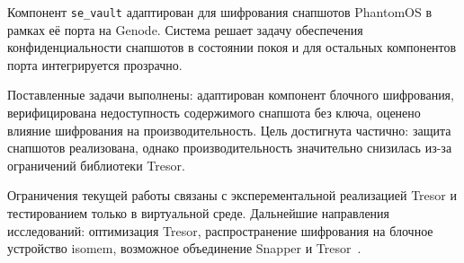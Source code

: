 \documentclass[oneside,final,14pt,a4paper]{extreport}
\theoremstyle{definition}
\theoremstyle{remark}
\theoremstyle{remark}
\begin{document}
Компонент \texttt{se\_vault} адаптирован для шифрования снапшотов PhantomOS в рамках её порта на Genode. Система решает задачу обеспечения конфиденциальности снапшотов в состоянии покоя и для остальных компонентов порта интегрируется прозрачно.

Поставленные задачи выполнены: адаптирован компонент блочного шифрования, верифицирована недоступность содержимого снапшота без ключа, оценено влияние шифрования на производительность. Цель достигнута частично: защита снапшотов реализована, однако производительность значительно снизилась из-за ограничений библиотеки Tresor.

Ограничения текущей работы связаны с эксперементальной реализацией Tresor и тестированием только в виртуальной среде. Дальнейшие направления исследований: оптимизация Tresor, распространение шифрования на блочное устройство isomem, возможное объединение Snapper и Tresor~\cite{FOSDEM_Snapper_paper}.


\printbibliography[heading=bibintoc,title={Список использованной литературы}]
\end{document}
